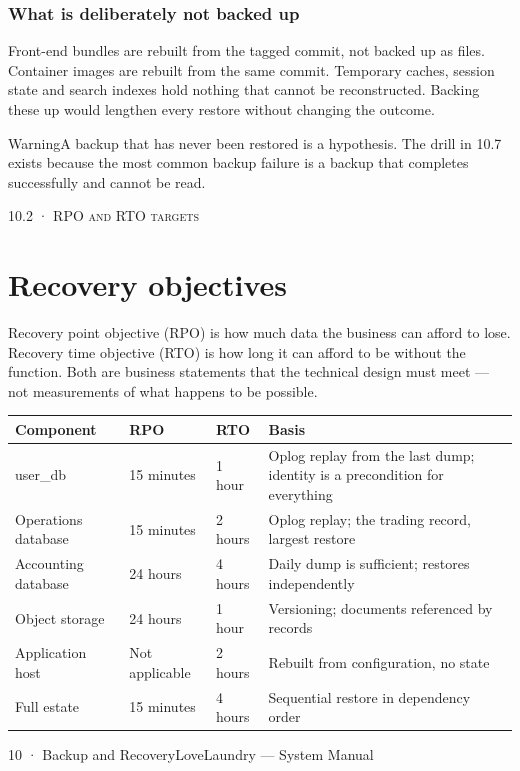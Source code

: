 \documentclass[11pt,a4paper,oneside]{book}
\begin{document}
\subsubsection*{What is deliberately not backed up}
Front-end bundles are rebuilt from the tagged commit, not backed up as files. Container images are rebuilt from the same commit. Temporary caches, session state and search indexes hold nothing that cannot be reconstructed. Backing these up would lengthen every restore without changing the outcome.

\begin{notebox}WarningA backup that has never been restored is a hypothesis. The drill in 10.7 exists because the most common backup failure is a backup that completes successfully and cannot be read.\end{notebox}
\textsc{\small\color{crimson}10.2 · RPO and RTO targets}\par\medskip
\section*{Recovery objectives}
Recovery point objective (RPO) is how much data the business can afford to lose. Recovery time objective (RTO) is how long it can afford to be without the function. Both are business statements that the technical design must meet — not measurements of what happens to be possible.

\begin{center}\small
\begin{tabularx}{\linewidth}{|X|X|X|X|}
\hline
\rowcolor{lightgrey}
\textbf{Component} & \textbf{RPO} & \textbf{RTO} & \textbf{Basis} \\ \hline
user\_db & 15 minutes & 1 hour & Oplog replay from the last dump; identity is a precondition for everything \\ \hline
Operations database & 15 minutes & 2 hours & Oplog replay; the trading record, largest restore \\ \hline
Accounting database & 24 hours & 4 hours & Daily dump is sufficient; restores independently \\ \hline
Object storage & 24 hours & 1 hour & Versioning; documents referenced by records \\ \hline
Application host & Not applicable & 2 hours & Rebuilt from configuration, no state \\ \hline
Full estate & 15 minutes & 4 hours & Sequential restore in dependency order \\ \hline
\end{tabularx}
\end{center}
10 · Backup and RecoveryLoveLaundry — System Manual
\end{document}
